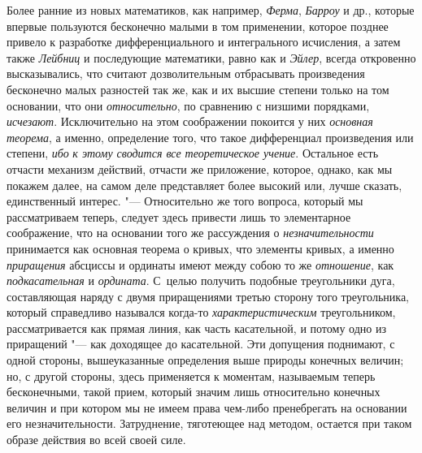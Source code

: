 Более ранние из новых математиков, как например,
{\em Ферма}, {\em Барроу} и др.,
которые впервые пользуются бесконечно малыми в том применении, которое
позднее привело к разработке дифференциального и интегрального исчисления, а
затем также {\em Лейбниц} и последующие математики,
равно как и {\em Эйлер}, всегда откровенно
высказывались, что считают дозволительным отбрасывать произведения
бесконечно малых разностей так же, как и их высшие степени только на том
основании, что они {\em относительно}, по сравнению с
низшими порядками, {\em исчезают}. Исключительно на
этом соображении покоится у них {\em основная теорема},
а именно, определение того, что такое дифференциал произведения или степени,
{\em ибо }{\em к этому сводится все
теоретическое учение}. Остальное есть отчасти механизм действий, отчасти же
приложение, которое, однако, как мы покажем далее, на самом деле
представляет более высокий или, лучше сказать, единственный интерес. "---
Относительно же того вопроса, который мы рассматриваем теперь, следует
здесь привести лишь то элементарное соображение, что на основании того же
рассуждения о {\em незначительности} принимается как
основная теорема о кривых, что элементы кривых, а именно
{\em приращения} абсциссы и ординаты имеют между собою
то же {\em отношение}, как
{\em подкасательная} и
{\em ордината}. С~целью получить подобные треугольники
дуга, составляющая наряду с двумя приращениями третью сторону того
треугольника, который справедливо назывался когда-то
{\em характеристическим} треугольником, рассматривается
как прямая линия, как часть касательной, и потому одно из приращений "--- как
доходящее до касательной. Эти допущения поднимают, с одной стороны,
вышеуказанные определения выше природы конечных величин; но, с другой
стороны, здесь применяется к моментам, называемым теперь бесконечными,
такой прием, который значим лишь относительно конечных величин и при
котором мы не имеем права чем-либо пренебрегать на основании его
незначительности. Затруднение, тяготеющее над методом, остается при таком
образе действия во всей своей силе.

